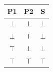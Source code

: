 \begin{tabular}{ccc}
\toprule
\textbf{P1} & \textbf{P2} & \textbf{S}\\
\midrule
\(\bot\) & \(\bot\) & \(\bot\)\\
\(\bot\) & \(\top\) & \(\bot\)\\
\(\top\) & \(\bot\) & \(\bot\)\\
\(\top\) & \(\top\) & \(\top\)\\
\bottomrule
\end{tabular}
